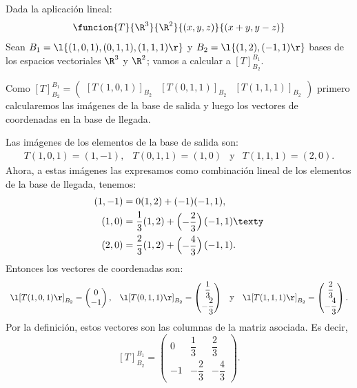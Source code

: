 \documentclass[compacto,10pt]{pubciencias-notas}
\begin{document}
\begin{ejem}\hspace{0pt}\label{Eje:S15MatAL}
Dada la aplicación lineal:
\[
    \funcion{T}{\R^3}{\R^2}{(x,y,z)}{(x + y,y - z)}
\]
Sean $ B_{1} = \l\{(1,0,1), (0,1,1), (1,1,1)\r\}$ y $B_{2} = \l\{(1,2), (- 1,1)\r\}$
bases de los espacios vectoriales $\R^{3}$ y $\R^{2}$; vamos a calcular a  $[T]^{B_{1}}_{B_{2}}$.

\noindent Como $[T]^{B_{1}}_{B_{2}} = \begin{pmatrix}
    [T(1, 0, 1)]_{B_{2}} & [T(0, 1, 1)]_{B_{2}} & [T(1, 1, 1)]_{B_{2}}
\end{pmatrix}$
primero calcularemos las imágenes de la base de salida y luego los vectores de coordenadas en la base de llegada.

\noindent Las imágenes de los elementos de la base de salida son:
\[
    \begin{array}{cccc}
        T(1,0,1) = (1,- 1), & 
        T(0,1,1) = (1,0) &
        \text{y} &
        T(1,1,1) = (2,0).
    \end{array}
\]
Ahora, a estas imágenes las expresamos como combinación lineal de los elementos de la base de llegada, tenemos:
\begin{align*}
    (1, -1) & = 0 (1, 2) + (-1) (-1, 1), \\
    (1, 0) & = \dfrac{1}{3} (1, 2) + \begin{pmatrix}
        -\dfrac{2}{3}
    \end{pmatrix}
    (-1, 1) \texty \\
    (2, 0) & = \dfrac{2}{3} (1, 2) + \begin{pmatrix}
        -\dfrac{4}{3}
    \end{pmatrix}
    (-1, 1).
\end{align*}
Entonces los vectores de coordenadas son:
\[
    \begin{array}{cccc}
        \l[T(1,0,1)\r]_{B_{2}} =\begin{pmatrix}0\\-1\end{pmatrix}, &
        \l[T(0,1,1)\r]_{B_{2}} =\begin{pmatrix}\dfrac{1}{3}\\-\dfrac{2}{3}\end{pmatrix} &
        \text{y} &
        \l[T(1,1,1)\r]_{B_{2}} =\begin{pmatrix}\dfrac{2}{3}\\-\dfrac{4}{3}\end{pmatrix}.
    \end{array}
\]
Por la definición, estos vectores son las columnas de la matriz asociada. Es decir,
\[
    [T]^{B_{1}}_{B_{2}} = 
    \begin{pmatrix}
        0&  \dfrac{1}{3}& \dfrac{2}{3}\\
        -1& -\dfrac{2}{3}& -\dfrac{4}{3}
    \end{pmatrix}.
\]
\end{ejem}
\end{document}
